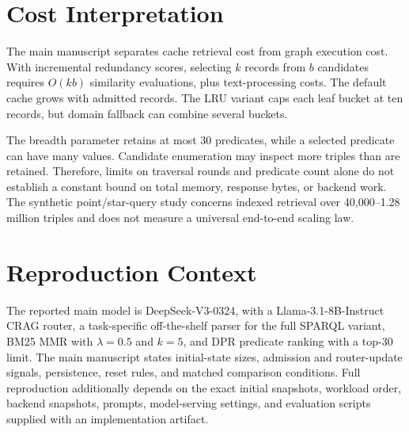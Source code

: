 \section{Cost Interpretation}
The main manuscript separates cache retrieval cost from graph execution cost. With incremental redundancy scores, selecting $k$ records from $b$ candidates requires $O(kb)$ similarity evaluations, plus text-processing costs. The default cache grows with admitted records. The LRU variant caps each leaf bucket at ten records, but domain fallback can combine several buckets.

The breadth parameter retains at most 30 predicates, while a selected predicate can have many values. Candidate enumeration may inspect more triples than are retained. Therefore, limits on traversal rounds and predicate count alone do not establish a constant bound on total memory, response bytes, or backend work. The synthetic point/star-query study concerns indexed retrieval over 40,000--1.28 million triples and does not measure a universal end-to-end scaling law.

\section{Reproduction Context}
The reported main model is DeepSeek-V3-0324, with a Llama-3.1-8B-Instruct CRAG router, a task-specific off-the-shelf parser for the full SPARQL variant, BM25 MMR with $\lambda=0.5$ and $k=5$, and DPR predicate ranking with a top-30 limit. The main manuscript states initial-state sizes, admission and router-update signals, persistence, reset rules, and matched comparison conditions. Full reproduction additionally depends on the exact initial snapshots, workload order, backend snapshots, prompts, model-serving settings, and evaluation scripts supplied with an implementation artifact.
